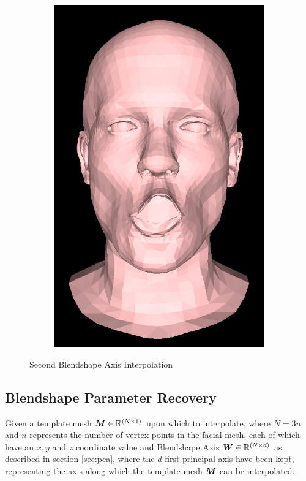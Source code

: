 \begin{figure}[h]
\begin{subfigure}[b]{0.24\textwidth}
        \includegraphics[width=\textwidth]{figures/blendshape_interp/2/00004.png}
    \end{subfigure}
    \caption{Second Blendshape Axis Interpolation}\label{fig:Blendshape_axis_2}
\end{figure}

\subsection{Blendshape Parameter Recovery}
Given a template mesh ${\boldsymbol{{M}}} \in \mathbb{R}^{(N \times 1)}$ upon which to interpolate, where $N = 3n$ and $n$ represents the number of vertex points in the facial mesh, each of which have an $x, y$ and $z$ coordinate value and Blendshape Axis ${\boldsymbol{{W}}} \in \mathbb{R}^{(N \times d)}$ as described in section \ref{sec:pca}, where the $d$ first principal axis have been kept, representing the axis along which the template mesh ${\boldsymbol{{M}}}$ can be interpolated.

